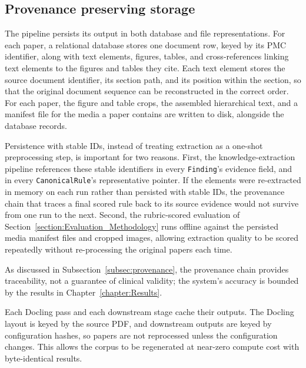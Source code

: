 \subsection{Provenance preserving storage}\label{subsec:doc-provenance-preserving-storage}

The pipeline persists its output in both database and file representations. For each paper, a relational database stores one document row, keyed by its PMC identifier, along with text elements, figures, tables, and cross-references linking text elements to the figures and tables they cite. Each text element stores the source document identifier, its section path, and its position within the section, so that the original document sequence can be reconstructed in the correct order. For each paper, the figure and table crops, the assembled hierarchical text, and a manifest file for the media a paper contains are written to disk, alongside the database records.

Persistence with stable IDs, instead of treating extraction as a one-shot preprocessing step, is important for two reasons. First, the knowledge-extraction pipeline references these stable identifiers in every \texttt{Finding}'s evidence field, and in every \texttt{CanonicalRule}'s representative pointer. If the elements were re-extracted in memory on each run rather than persisted with stable IDs, the provenance chain that traces a final scored rule back to its source evidence would not survive from one run to the next. Second, the rubric-scored evaluation of Section~\ref{section:Evaluation_Methodology} runs offline against the persisted media manifest files and cropped images, allowing extraction quality to be scored repeatedly without re-processing the original papers each time. 

As discussed in Subsection~\ref{subsec:provenance}, the provenance chain provides traceability, not a guarantee of clinical validity; the system's accuracy is bounded by the results in Chapter~\ref{chapter:Results}.

Each Docling pass and each downstream stage cache their outputs. The Docling layout is keyed by the source PDF, and downstream outputs are keyed by configuration hashes, so papers are not reprocessed unless the configuration changes. This allows the corpus to be regenerated at near-zero compute cost with byte-identical results.